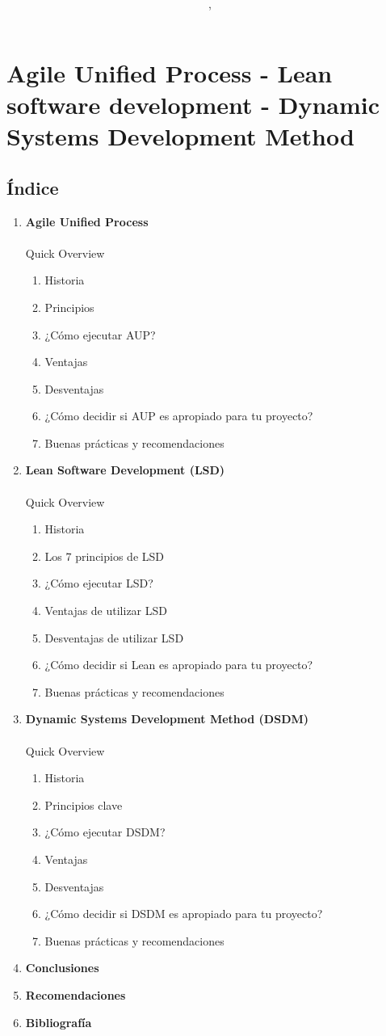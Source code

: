 \documentclass{article}
\author{\nombre , \carnet}
\title{\textbf{\Huge\titulo}}
\begin{document}
\maketitle
\section {Agile Unified Process - Lean software development - 
Dynamic Systems Development Method}
\subsection{Índice}
\begin{enumerate}
	\item \textbf{Agile Unified Process} \\\\
		Quick Overview
		\begin{enumerate}
			\item Historia
			\item Principios
			\item ¿Cómo ejecutar AUP?
			\item Ventajas
			\item Desventajas
			\item ¿Cómo decidir si AUP es apropiado
				para tu proyecto?
			\item Buenas prácticas y recomendaciones
		\end{enumerate}
	\item \textbf{Lean Software Development (LSD)} \\\\
		Quick Overview
		\begin{enumerate}
			\item Historia
			\item Los 7 principios de LSD
			\item ¿Cómo ejecutar LSD?
			\item Ventajas de utilizar LSD
			\item Desventajas de utilizar LSD
			\item ¿Cómo decidir si Lean es apropiado
				para tu proyecto?
			\item Buenas prácticas y recomendaciones
		\end{enumerate}
	\item \textbf{Dynamic Systems Development Method (DSDM)} \\\\
		Quick Overview
		\begin{enumerate}
			\item Historia
			\item Principios clave
			\item ¿Cómo ejecutar DSDM?
			\item Ventajas
			\item Desventajas
			\item ¿Cómo decidir si DSDM es apropiado
				para tu proyecto?
			\item Buenas prácticas y recomendaciones
		\end{enumerate}
	\item \textbf{Conclusiones}
	\item \textbf{Recomendaciones}
	\item \textbf{Bibliografía}
\end{enumerate}
\end{document}
